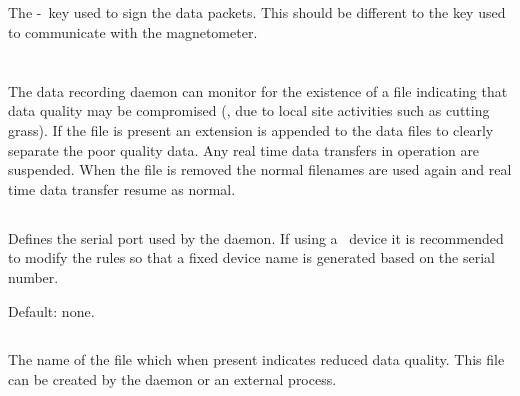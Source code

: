 \subsection{}
The \hmac-\mdfive\ key used to sign the data packets. This should be
different to the key used to communicate with the magnetometer.

\section{\code{[dataqualitymonitor]}}

The data recording daemon can monitor for the existence of a file
indicating that data quality may be compromised (\eg, due to local
site activities such as cutting grass). If the file is present an
extension is appended to the data files to clearly separate the poor
quality data. Any real time data transfers in operation are
suspended. When the file is removed the normal filenames are used
again and real time data transfer resume as normal.

\subsection{}
Defines the serial port used by the 
daemon. If using a \usb\ device it is recommended to modify the
 rules so that a fixed device name is generated based on
the serial number. 


Default: none.

\subsection{}
The name of the file which when present indicates reduced data
quality. This file can be created by the 
daemon or an external process.

